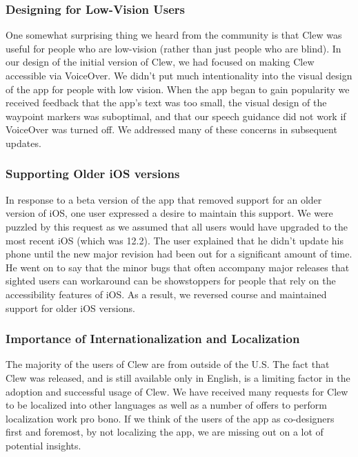 \documentclass[chi_draft]{sigchi}
\begin{document}
\subsubsection{Designing for Low-Vision Users}
One somewhat surprising thing we heard from the community is that Clew was useful for people who are low-vision (rather than just people who are blind).  In our design of the initial version of Clew, we had focused on making Clew  accessible via VoiceOver.  We didn't put much intentionality into the visual design of the app for people with low vision.  When the app began to gain popularity we received feedback that the app's text was too small, the visual design of the waypoint markers was suboptimal, and that our speech guidance did not work if VoiceOver was turned off.  We addressed many of these concerns in subsequent updates.

\subsubsection{Supporting Older iOS versions}

In response to a beta version of the app that removed support for an older version of iOS, one user expressed a desire to maintain this support.  We were puzzled by this request as we assumed that all users would have upgraded to the most recent iOS (which was 12.2).  The user explained that he didn't update his phone until the new major revision had been out for a significant amount of time.  He went on to say that the minor bugs that often accompany major releases that sighted users can workaround can be showstoppers for people that rely on the accessibility features of iOS.  As a result, we reversed course and maintained support for older iOS versions.

\subsubsection{Importance of Internationalization and Localization}

The majority of the users of Clew are from outside of the U.S.  The fact that Clew was released, and is still available only in English, is a limiting factor in the adoption and successful usage of Clew.  We have received many requests for Clew to be localized into other languages as well as a number of offers to perform localization work pro bono.  If we think of the users of the app as co-designers first and foremost, by not localizing the app, we are missing out on a lot of potential insights. %
\end{document}
